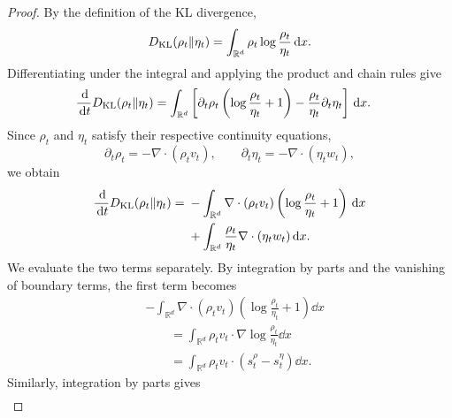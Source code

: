 \documentclass[12pt,a4paper,oneside]{book}
\begin{document}
\begin{proof}
By the definition of the KL divergence,
\begin{equation*}
    D_{\mathrm{KL}}(\rho_t\Vert\eta_t)
    =\int_{\mathbb R^d}\rho_t
    \log\frac{\rho_t}{\eta_t}\,\mathrm{d} x.
\end{equation*}
Differentiating under the integral and applying the product and chain rules give
\begin{equation*}
    \begin{aligned}
        \frac{\,\mathrm{d}}{\,\mathrm{d} t}D_{\mathrm{KL}}(\rho_t\Vert\eta_t)
        &=\int_{\mathbb R^d}
        \left[
            \partial_t\rho_t
            \left(\log\frac{\rho_t}{\eta_t}+1\right)
            -\frac{\rho_t}{\eta_t}\partial_t\eta_t
        \right]\,\mathrm{d} x.
    \end{aligned}
\end{equation*}
Since $\rho_t$ and $\eta_t$ satisfy their respective continuity equations,
\begin{equation*}
    \partial_t\rho_t=-\nabla\cdot(\rho_t v_t),
    \qquad
    \partial_t\eta_t=-\nabla\cdot(\eta_t w_t),
\end{equation*}
we obtain
\begin{equation*}
    \begin{aligned}
        \frac{\,\mathrm{d}}{\,\mathrm{d} t}D_{\mathrm{KL}}(\rho_t\Vert\eta_t)
        ={}&
        -\int_{\mathbb R^d}
        \nabla\cdot(\rho_t v_t)
        \left(\log\frac{\rho_t}{\eta_t}+1\right)\,\mathrm{d} x\\
        &+
        \int_{\mathbb R^d}
        \frac{\rho_t}{\eta_t}
        \nabla\cdot(\eta_t w_t)\,\mathrm{d} x.
    \end{aligned}
\end{equation*}
We evaluate the two terms separately. By integration by parts and the
vanishing of boundary terms, the first term becomes
\begin{equation*}
    \begin{aligned}
        &-\int_{\mathbb R^d}
        \nabla\cdot(\rho_t v_t)
        \left(\log\frac{\rho_t}{\eta_t}+1\right)\dd x\\
        &\qquad=
        \int_{\mathbb R^d}
        \rho_t v_t\cdot
        \nabla\log\frac{\rho_t}{\eta_t}\dd x\\
        &\qquad=
        \int_{\mathbb R^d}
        \rho_t v_t\cdot(s_t^\rho-s_t^\eta)\dd x.
    \end{aligned}
\end{equation*}
Similarly, integration by parts gives
\begin{equation*}
    \begin{aligned}

\end{aligned}
\end{equation*}
\end{proof}
\end{document}
